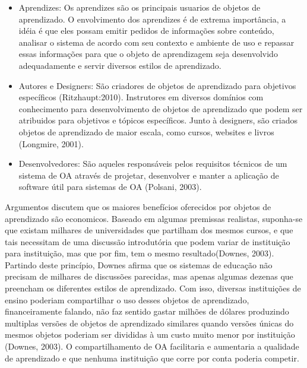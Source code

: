 \documentclass[12pt,openright,oneside,a4paper,english,french,spanish,brazil]{unifil}
\begin{document}
\begin{itemize}
\item Aprendizes: Os aprendizes são os principais usuarios de objetos de aprendizado. O envolvimento dos aprendizes é de extrema importância, a idéia é que eles possam emitir pedidos de informações sobre conteúdo, analisar o sistema de acordo com seu contexto e ambiente de uso e repassar essas informações para que o objeto de aprendizagem seja desenvolvido adequadamente e servir diversos estilos de aprendizado.
\item Autores e Designers: São criadores de objetos de aprendizado para objetivos específicos (Ritzhaupt:2010). Instrutores em diversos domínios com conhecimento para desenvolvimento de objetos de aprendizado que podem ser atribuidos para objetivos e tópicos específicos. Junto à designers, são criados objetos de aprendizado de maior escala, como cursos, websites e livros (Longmire, 2001).
\item Desenvolvedores: São aqueles responsáveis pelos requisitos técnicos de um sistema de OA através de projetar, desenvolver e manter a aplicação de software útil para sistemas de OA (Polsani, 2003). 
\end{itemize}

Argumentos discutem que os maiores benefícios oferecidos por objetos de aprendizado são economicos. Baseado em algumas premissas realistas, suponha-se que existam milhares de universidades que partilham dos mesmos cursos, e que tais necessitam de uma discussão introdutória que podem variar de instituição para instituição, mas que por fim, tem o mesmo resultado(Downes, 2003). Partindo deste princípio, Downes afirma que os sistemas de educação não precisam de milhares de discussões parecidas, mas apenas algumas dezenas que preencham os diferentes estilos de aprendizado. Com isso, diversas instituições de ensino poderiam compartilhar o uso desses objetos de aprendizado, financeiramente falando, não faz sentido gastar milhões de dólares produzindo multiplas versões de objetos de aprendizado similares quando versões únicas do mesmos objetos poderiam ser divididas à um custo muito menor por instituição (Downes, 2003). O compartilhamento de OA facilitaria e aumentaria a qualidade de aprendizado e que nenhuma instituição que corre por conta poderia competir.
\end{document}
